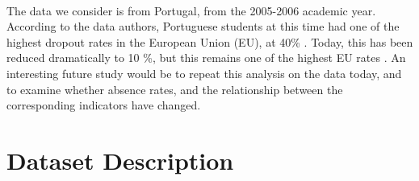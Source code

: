 \documentclass[12pt, titlepage]{article}
\begin{document}
	\paragraph{} The data we consider is from Portugal, from the 2005-2006 academic year. According to the data authors, Portuguese students at this time had one of the highest dropout rates in the European Union (EU), at 40\% \cite{Cortez::2008}. Today, this has been reduced dramatically to 10 \%, but this remains one of the highest EU rates \cite{eurostat}. An interesting future study would be to repeat this analysis on the data today, and to examine whether absence rates, and the relationship between the corresponding indicators have changed. 
	
	\section{Dataset Description}
\end{document}
